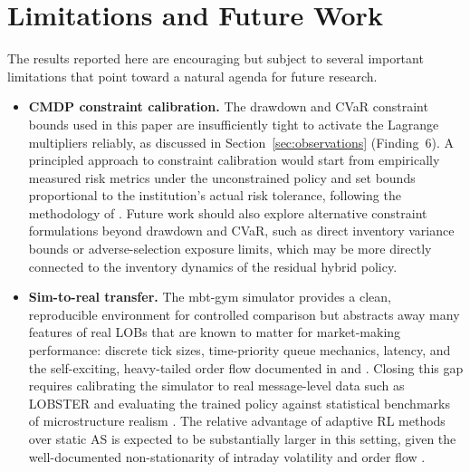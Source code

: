 \documentclass[11pt]{article}
\begin{document}
\section{Limitations and Future Work}
\label{sec:limitations}

The results reported here are encouraging but subject to several
important limitations that point toward a natural agenda for future
research.

\begin{itemize}[leftmargin=*, itemsep=6pt]
  \item \textbf{CMDP constraint calibration.}
    The drawdown and CVaR constraint bounds used in this paper are
    insufficiently tight to activate the Lagrange multipliers reliably,
    as discussed in Section~\ref{sec:observations} (Finding~6).
    A principled approach to constraint calibration would start from
    empirically measured risk metrics under the unconstrained policy and
    set bounds proportional to the institution's actual risk tolerance,
    following the methodology of \textcite{altschuler2024multi}.
    Future work should also explore alternative constraint formulations
    beyond drawdown and CVaR, such as direct inventory variance bounds
    or adverse-selection exposure limits, which may be more directly
    connected to the inventory dynamics of the residual hybrid policy.

  \item \textbf{Sim-to-real transfer.}
    The mbt-gym simulator provides a clean, reproducible environment
    for controlled comparison but abstracts away many features of real
    LOBs that are known to matter for market-making performance:
    discrete tick sizes, time-priority queue mechanics, latency, and
    the self-exciting, heavy-tailed order flow documented in
    \textcite{cont2010stochastic} and \textcite{bouchaud2018trades}.
    Closing this gap requires calibrating the simulator to real
    message-level data such as LOBSTER \parencite{lobsterdata} and
    evaluating the trained policy against statistical benchmarks of
    microstructure realism \parencite{lobbench2025}.
    The relative advantage of adaptive RL methods over static AS
    is expected to be substantially larger in this setting, given the
    well-documented non-stationarity of intraday volatility and order
    flow \parencite{hendershott2011does,menkveld2013high}.


\end{itemize}
\end{document}
